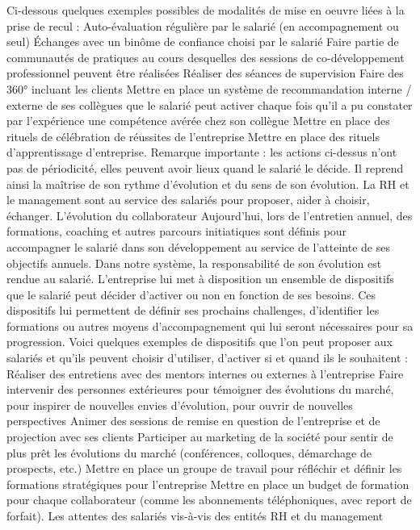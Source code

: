 \documentclass[12pt]{article}
\begin{document}
 Ci-dessous quelques exemples possibles de modalités de mise en oeuvre liées à la prise de recul :
 Auto-évaluation régulière par le salarié (en accompagnement ou seul)
 Échanges avec un binôme de confiance choisi par le salarié
 Faire partie de communautés de pratiques au cours desquelles des sessions de co-développement professionnel peuvent être réalisées
 Réaliser des séances de supervision
 Faire des 360° incluant les clients
 Mettre en place un système de recommandation interne / externe de ses collègues que le salarié peut activer chaque fois qu’il a pu constater par l’expérience une compétence avérée chez son collègue
 Mettre en place des rituels de célébration de réussites de l’entreprise
 Mettre en place des rituels d’apprentissage d’entreprise.
 Remarque importante : les actions ci-dessus n’ont pas de périodicité, elles peuvent avoir lieux quand le salarié le décide. Il reprend ainsi la maîtrise de son rythme d’évolution et du sens de son évolution.
 La RH et le management sont au service des salariés pour proposer, aider à choisir, échanger. 
 L’évolution du collaborateur
 Aujourd’hui, lors de l’entretien annuel, des formations, coaching et autres parcours initiatiques sont définis pour accompagner le salarié dans son développement au service de l’atteinte de ses objectifs annuels.
 Dans notre système, la responsabilité de son évolution est rendue au salarié. L’entreprise lui met à disposition un ensemble de dispositifs que le salarié peut décider d’activer ou non en fonction de ses besoins. Ces dispositifs lui permettent de définir ses prochains challenges, d’identifier les formations ou autres moyens d'accompagnement qui lui seront nécessaires pour sa progression.
 Voici quelques exemples de dispositifs que l’on peut proposer aux salariés et qu’ils peuvent choisir d’utiliser, d’activer si et quand ils le souhaitent :
 Réaliser des entretiens avec des mentors internes ou externes à l’entreprise
 Faire intervenir des personnes extérieures pour témoigner des évolutions du marché, pour inspirer de nouvelles envies d’évolution, pour ouvrir de nouvelles perspectives
 Animer des sessions de remise en question de l’entreprise et de projection avec ses clients
 Participer au marketing de la société pour sentir de plus prêt les évolutions du marché (conférences, colloques, démarchage de prospects, etc.)
 Mettre en place un groupe de travail pour réfléchir et définir les formations stratégiques pour l’entreprise
 Mettre en place un budget de formation pour chaque collaborateur (comme les abonnements téléphoniques, avec report de forfait).
 Les attentes des salariés vis-à-vis des entités RH et du management 
\end{document}
